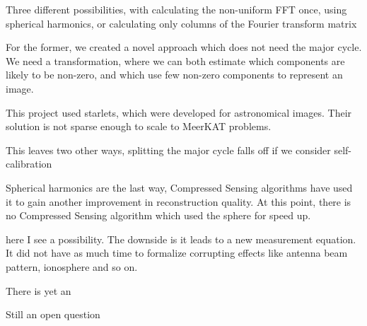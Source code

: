 Three different possibilities, with calculating the non-uniform FFT once, using spherical harmonics, or calculating only columns of the Fourier transform matrix

For the former, we created a novel approach which does not need the major cycle. We need a transformation, where we can both estimate which components are likely to be non-zero, and which use few non-zero components to represent an image.

This project used starlets, which were developed for astronomical images. Their solution is not sparse enough to scale to MeerKAT problems.

This leaves two other ways, splitting the major cycle falls off if we consider self-calibration



Spherical harmonics are the last way,
Compressed Sensing algorithms have used it to gain another improvement in reconstruction quality. At this point, there is no Compressed Sensing algorithm which used the sphere for speed up.

here I see a possibility. The downside is it leads to a new measurement equation. It did not have as much time to formalize corrupting effects like antenna beam pattern, ionosphere and so on.

There is yet an



 
Still an open question








